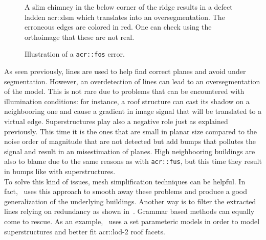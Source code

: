 \begin{figure}[htbp]
{\begin{subfloatrow}
{                                }{
                                    \label{subfig::fos_2d}
                                    \caption{
                                        A slim chimney in the below corner of the ridge results in a defect ladden \gls{acr::dsm} which translates into an oversegmentation.
                                        The erroneous edges are colored in red.
                                        One can check using the orthoimage that these are not real.
                                    }
                                }
                        \end{subfloatrow}
                    }{
                        \caption{
                            \label{fig::fos}
                            Illustration of a \texttt{\gls{acr::fos}} error.
                        }
                    }
                \end{figure}

                As seen previously, lines are used to help find correct planes and avoid under segmentation.
                However, an overdetection of lines can lead to an oversegmentation of the model.
                This is not rare due to problems that can be encountered with illumination conditions: for instance, a roof structure can cast its shadow on a neighbooring one and cause a gradient in image signal that will be translated to a virtual edge.
                Superstructures play also a negative role just as explained previously.
                This time it is the ones that are small in planar size compared to the noise order of magnitude that are not detected but add bumps that pollutes the signal and result in an misestimation of planes.
                High neighbooring buildings are also to blame due to the same reasons as with \texttt{\gls{acr::fus}}, but this time they result in bumps like with superstructures.\\

                To solve this kind of issues, mesh simplification techniques can be helpful.
                In fact,~\textcite{verdie2015lod} uses this approach to smooth away these problems and produce a good generalization of the underlying buildings.
                Another way is to filter the extracted lines relying on redundancy as shown in~\textcite{michelin2013quality}.
                Grammar based methods can equally come to rescue.
                As an example,~\textcite{bredif20073d} uses a set parameteric models in order to model superstructures and better fit \gls{acr::lod}-2 roof facets.

